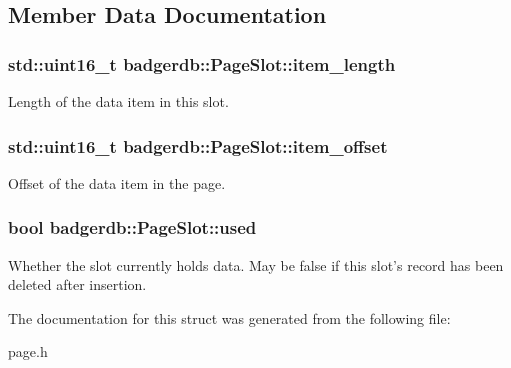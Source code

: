 \subsection{Member Data Documentation}
\hypertarget{structbadgerdb_1_1PageSlot_a675118fb03cd9e1b35970a1f10bda9d8}{
\subsubsection[{item\-\_\-length}]{\setlength{\rightskip}{0pt plus 5cm}std\-::uint16\-\_\-t badgerdb\-::\-Page\-Slot\-::item\-\_\-length}}\label{structbadgerdb_1_1PageSlot_a675118fb03cd9e1b35970a1f10bda9d8}
Length of the data item in this slot. \hypertarget{structbadgerdb_1_1PageSlot_a81c14b0e942b0d59e6ac31667d958b79}{
\subsubsection[{item\-\_\-offset}]{\setlength{\rightskip}{0pt plus 5cm}std\-::uint16\-\_\-t badgerdb\-::\-Page\-Slot\-::item\-\_\-offset}}\label{structbadgerdb_1_1PageSlot_a81c14b0e942b0d59e6ac31667d958b79}
Offset of the data item in the page. \hypertarget{structbadgerdb_1_1PageSlot_a4ea5ad6e73525244bb368181f21fd018}{
\subsubsection[{used}]{\setlength{\rightskip}{0pt plus 5cm}bool badgerdb\-::\-Page\-Slot\-::used}}\label{structbadgerdb_1_1PageSlot_a4ea5ad6e73525244bb368181f21fd018}
Whether the slot currently holds data. May be false if this slot's record has been deleted after insertion. 

The documentation for this struct was generated from the following file\-:\begin{DoxyCompactItemize}
\item 
page.\-h\end{DoxyCompactItemize}
